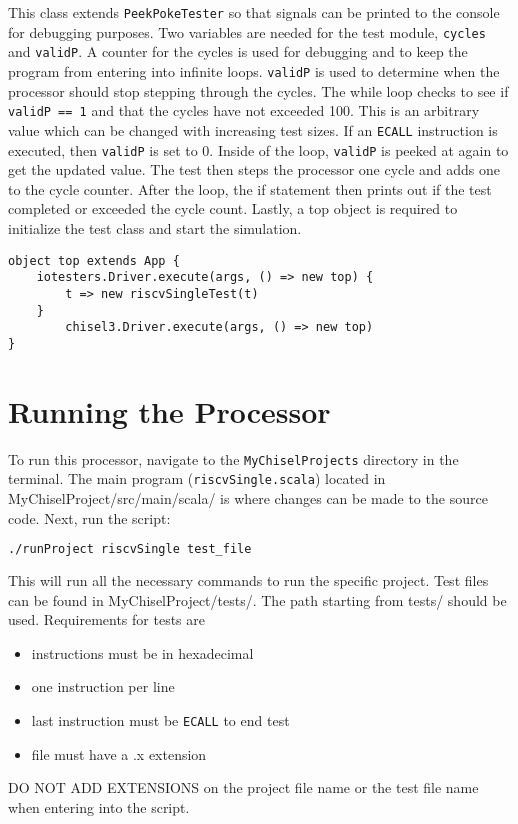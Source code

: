 \documentclass[12pt, letterpaper]{report}
\begin{document}
\noindent This class extends \verb|PeekPokeTester| so that signals can be printed to the console for debugging purposes.
Two variables are needed for the test module, \verb|cycles| and \verb|validP|.
A counter for the cycles is used for debugging and to keep the program from entering into infinite loops.
\verb|validP| is used to determine when the processor should stop stepping through the cycles.
The while loop checks to see if \verb|validP == 1| and that the cycles have not exceeded 100.
This is an arbitrary value which can be changed with increasing test sizes.
If an \verb|ECALL| instruction is executed, then \verb|validP| is set to 0.
Inside of the loop, \verb|validP| is peeked at again to get the updated value. 
The test then steps the processor one cycle and adds one to the cycle counter.
After the loop, the if statement then prints out if the test completed or exceeded the cycle count.
\newline
Lastly, a top object is required to initialize the test class and start the simulation.
\begin{lstlisting}[style=scala]
object top extends App {
	iotesters.Driver.execute(args, () => new top) {
		t => new riscvSingleTest(t)
	}
		chisel3.Driver.execute(args, () => new top)
}
\end{lstlisting}

\section{Running the Processor}
To run this processor, navigate to the \verb|MyChiselProjects| directory in the terminal.
The main program (\verb|riscvSingle.scala|) located in MyChiselProject/src/main/scala/ is where changes can be made to the source code.
Next, run the script:

\begin{lstlisting}[language=bash]
	./runProject riscvSingle test_file
\end{lstlisting}

\noindent This will run all the necessary commands to run the specific project. Test files can be found in MyChiselProject/tests/.
The path starting from tests/ should be used. Requirements for tests are 
\begin{itemize}
	\item instructions must be in hexadecimal
	\item one instruction per line
	\item last instruction must be \verb|ECALL| to end test
	\item file must have a .x extension
\end{itemize}
DO NOT ADD EXTENSIONS on the project file name or the test file name when entering into the script.  
\end{document}
